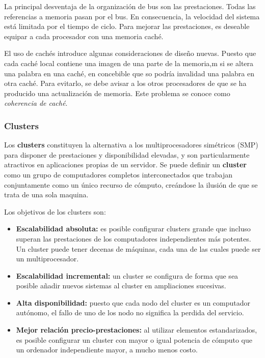 La principal desventaja de la organización de bus son las prestaciones. Todas las referencias a memoria pasan por el bus. En consecuencia, la velocidad del sistema está limitada por el tiempo de ciclo. Para mejorar las prestaciones, es deseable equipar a cada procesador con una memoria caché.

El uso de cachés introduce algunas consideraciones de diseño nuevas. Puesto que cada caché local contiene una imagen de una parte de la memoria,m si se altera una palabra en una caché, en concebible que so podría invalidad una palabra en otra caché. Para evitarlo, se debe avisar a los otros procesadores de que se ha producido una actualización de memoria. Este problema se conoce como \textit{coherencia de caché}.

\subsubsection{Clusters}

Los \textbf{clusters} constituyen la alternativa a los multiprocesadores simétricos (SMP) para disponer de prestaciones y disponibilidad elevadas, y son particularmente atractivos en aplicaciones propias de un servidor. Se puede definir un \textbf{cluster} como un grupo de computadores completos interconectados que trabajan conjuntamente como un único recurso de cómputo, creándose la ilusión de que se trata de una sola maquina.

Los objetivos de los clusters son:

\begin{itemize}
  \item \textbf{Escalabilidad absoluta:} es posible configurar clusters grande que incluso superan las prestaciones de los computadores independientes más potentes. Un cluster puede tener decenas de máquinas, cada una de las cuales puede ser un multiprocesador.
  \item \textbf{Escalabilidad incremental:} un cluster se configura de forma que sea posible añadir nuevos sistemas al cluster en ampliaciones sucesivas.
  \item \textbf{Alta disponibilidad:} puesto que cada nodo del cluster es un computador autónomo, el fallo de uno de los nodo no significa la perdida del servicio.
  \item \textbf{Mejor relación precio-prestaciones:} al utilizar elementos estandarizados, es posible configurar un cluster con mayor o igual potencia de cómputo que un ordenador independiente mayor, a mucho menos costo.
\end{itemize}


